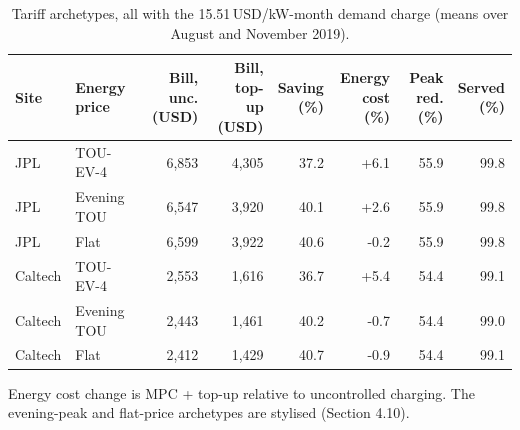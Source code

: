 \begin{table}[!htbp]
\centering
\caption{Tariff archetypes, all with the 15.51\,USD/kW-month demand charge (means over August and November 2019).}
\label{tab:arch}
\footnotesize
\setlength{\tabcolsep}{1.5pt}
\begin{tabular*}{\textwidth}{@{\extracolsep{\fill}}llrrrrrr@{}}
\hline
Site & Energy price & \makecell[c]{Bill, unc.\\(USD)} & \makecell[c]{Bill, top-\\up (USD)} & \makecell[c]{Saving\\(\%)} & \makecell[c]{Energy\\cost (\%)} & \makecell[c]{Peak\\red. (\%)} & \makecell[c]{Served\\(\%)} \\
\hline
JPL & TOU-EV-4 & 6,853 & 4,305 & 37.2 & +6.1 & 55.9 & 99.8 \\
JPL & Evening TOU & 6,547 & 3,920 & 40.1 & +2.6 & 55.9 & 99.8 \\
JPL & Flat & 6,599 & 3,922 & 40.6 & -0.2 & 55.9 & 99.8 \\
\hline
Caltech & TOU-EV-4 & 2,553 & 1,616 & 36.7 & +5.4 & 54.4 & 99.1 \\
Caltech & Evening TOU & 2,443 & 1,461 & 40.2 & -0.7 & 54.4 & 99.0 \\
Caltech & Flat & 2,412 & 1,429 & 40.7 & -0.9 & 54.4 & 99.1 \\
\hline
\end{tabular*}
\par\smallskip\parbox{\textwidth}{\scriptsize Energy cost change is MPC + top-up relative to uncontrolled charging. The evening-peak and flat-price archetypes are stylised (Section 4.10).}
\end{table}
